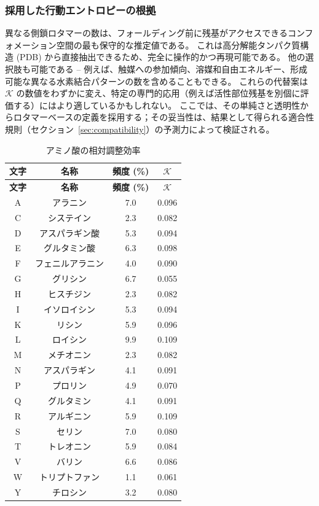 \documentclass[12pt,a4paper]{ltjsarticle}
\newcommand{\REL}{\mathcal{K}}          %
\begin{document}
	\subsubsection*{採用した行動エントロピーの根拠}
	異なる側鎖ロタマーの数は、フォールディング前に残基がアクセスできるコンフォメーション空間の最も保守的な推定値である。
	これは高分解能タンパク質構造 (PDB) から直接抽出できるため、完全に操作的かつ再現可能である。
	他の選択肢も可能である – 例えば、触媒への参加傾向、溶媒和自由エネルギー、形成可能な異なる水素結合パターンの数を含めることもできる。
	これらの代替案は \(\REL\) の数値をわずかに変え、特定の専門的応用（例えば活性部位残基を別個に評価する）にはより適しているかもしれない。
	ここでは、その単純さと透明性からロタマーベースの定義を採用する；その妥当性は、結果として得られる適合性規則（セクション~\ref{sec:compatibility}）の予測力によって検証される。
	
	\begin{longtable}{|c|c|c|c|}
		\caption{アミノ酸の相対調整効率}\label{tab:amino}\\
		\hline
		\textbf{文字} & \textbf{名称} & \textbf{頻度 (\%)} & \(\REL\) \\
		\hline
		\endfirsthead
		\hline
		\textbf{文字} & \textbf{名称} & \textbf{頻度 (\%)} & \(\REL\) \\
		\hline
		\endhead
		\hline
		A & アラニン & 7.0 & 0.096 \\
		C & システイン & 2.3 & 0.082 \\
		D & アスパラギン酸 & 5.3 & 0.094 \\
		E & グルタミン酸 & 6.3 & 0.098 \\
		F & フェニルアラニン & 4.0 & 0.090 \\
		G & グリシン & 6.7 & 0.055 \\
		H & ヒスチジン & 2.3 & 0.082 \\
		I & イソロイシン & 5.3 & 0.094 \\
		K & リシン & 5.9 & 0.096 \\
		L & ロイシン & 9.9 & 0.109 \\
		M & メチオニン & 2.3 & 0.082 \\
		N & アスパラギン & 4.1 & 0.091 \\
		P & プロリン & 4.9 & 0.070 \\
		Q & グルタミン & 4.1 & 0.091 \\
		R & アルギニン & 5.9 & 0.109 \\
		S & セリン & 7.0 & 0.080 \\
		T & トレオニン & 5.9 & 0.084 \\
		V & バリン & 6.6 & 0.086 \\
		W & トリプトファン & 1.1 & 0.061 \\
		Y & チロシン & 3.2 & 0.080 \\
		\hline
	\end{longtable}
	
\end{document}
